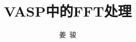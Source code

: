 
\title{\rm{VASP}中的\rm{FFT}处理}
\author[ ]{姜~骏}   %
\renewcommand*{\Authfont}{\small\rm} %
\renewcommand*{\Affilfont}{\small\it} %
\renewcommand\Authands{ and } %
\renewcommand\Authands{ , } %
\date{} %


